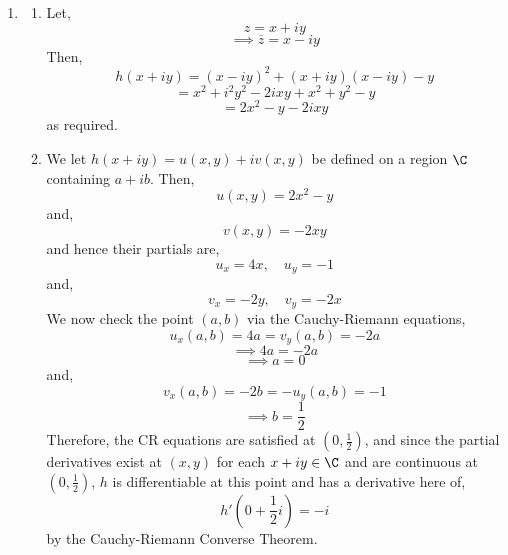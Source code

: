 \begin{enumerate}[label=(\alph*)]
    \item 
    \begin{enumerate}
        \item 
        Let,
        \[
        z = x + iy
        \]
        \[
        \implies \overline{z} = x - iy
        \]
        Then,
        \[
        h(x+iy) = (x-iy)^2 + (x+iy)(x-iy) - y
        \]
        \[
        = x^2 + i^2y^2 - 2ixy +x^2 +y^2 - y
        \]
        \[
        = 2x^2 - y - 2ixy
        \]
        as required.
        \item 
        We let $h(x+iy)=u(x,y)+iv(x,y)$ be defined on a region $\C$ containing $a+ib$. Then,
        \[
        u(x,y)=2x^2 - y
        \]
        and,
        \[
        v(x,y)=-2xy
        \]
        and hence their partials are,
        \[
        u_x = 4x,\quad u_y = -1
        \]
        and,
        \[
        v_x = -2y,\quad v_y = -2x
        \]
        We now check the point $(a,b)$ via the Cauchy-Riemann equations,
        \[
        u_x(a,b) = 4a = v_y(a,b) = -2a
        \]
        \[
        \implies 4a = -2a
        \]
        \[
        \implies a = 0
        \]
        and,
        \[
        v_x(a,b)=-2b = -u_y(a,b) = -1
        \]
        \[
        \implies b = \frac{1}{2}
        \]
        Therefore, the CR equations are satisfied at $(0, \frac{1}{2})$, and since the partial derivatives exist at $(x,y)$ for each $x+iy \in \C$ and are continuous at $(0, \frac{1}{2})$, $h$ is differentiable at this point and has a derivative here of,
        \[
        h'(0+\frac{1}{2}i) = - i
        \]
        by the Cauchy-Riemann Converse Theorem.
        \end{enumerate}
\end{enumerate}

\begin{figure}[p]
\centering
    
\end{figure}
